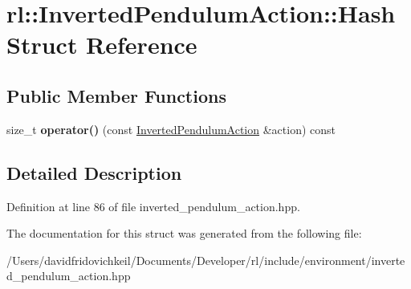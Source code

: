 \hypertarget{structrl_1_1_inverted_pendulum_action_1_1_hash}{}\section{rl\+:\+:Inverted\+Pendulum\+Action\+:\+:Hash Struct Reference}
\label{structrl_1_1_inverted_pendulum_action_1_1_hash}
\subsection*{Public Member Functions}
\begin{DoxyCompactItemize}
\item 
\hypertarget{structrl_1_1_inverted_pendulum_action_1_1_hash_af5513ab239a1fee61024a8abeb0a1c59}{}\label{structrl_1_1_inverted_pendulum_action_1_1_hash_af5513ab239a1fee61024a8abeb0a1c59} 
size\+\_\+t {\bfseries operator()} (const \hyperlink{structrl_1_1_inverted_pendulum_action}{Inverted\+Pendulum\+Action} \&action) const
\end{DoxyCompactItemize}


\subsection{Detailed Description}


Definition at line 86 of file inverted\+\_\+pendulum\+\_\+action.\+hpp.



The documentation for this struct was generated from the following file\+:\begin{DoxyCompactItemize}
\item 
/\+Users/davidfridovichkeil/\+Documents/\+Developer/rl/include/environment/inverted\+\_\+pendulum\+\_\+action.\+hpp\end{DoxyCompactItemize}
